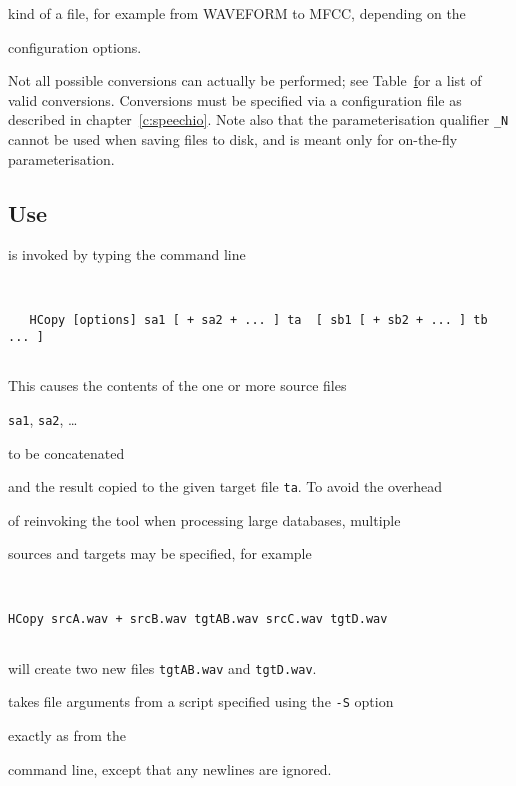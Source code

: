 kind of a file, for example from WAVEFORM to MFCC, depending on the


configuration options. 


Not all possible conversions can actually be performed; see Table~\href{t:validcons} for a list of valid conversions. Conversions must be specified via a configuration file as described in chapter~\ref{c:speechio}. Note also that the parameterisation qualifier \texttt{\_N} cannot be used when saving files to disk, and is meant only for on-the-fly parameterisation. 





\subsection{Use}





 is invoked by typing the command line


\begin{verbatim}


   HCopy [options] sa1 [ + sa2 + ... ] ta  [ sb1 [ + sb2 + ... ] tb ... ]


\end{verbatim}


This causes the contents of the one or more source files 


\texttt{sa1}, \texttt{sa2}, \ldots


 to be concatenated


and the result copied to the given target file \texttt{ta}. To avoid the overhead


of reinvoking the tool when processing large databases, multiple


sources and targets may be specified, for example


\begin{verbatim}


HCopy srcA.wav + srcB.wav tgtAB.wav srcC.wav tgtD.wav


\end{verbatim}


will create two new files \texttt{tgtAB.wav} and  \texttt{tgtD.wav}.


 takes file arguments from a script specified using the \texttt{-S} option


exactly as from the


command line, except that any newlines are ignored. 





